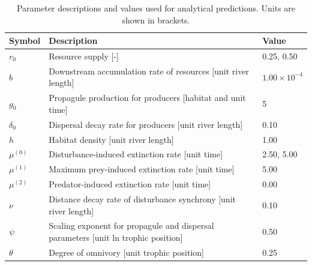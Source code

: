 \begin{table}[ht]
\centering
\caption{Parameter descriptions and values used for analytical predictions. Units are shown in brackets.} 
\label{tab:parms}
\begingroup\small
\begin{tabularx}{\textwidth}{lll}
  \hline
Symbol & Description & Value \\ 
  \hline
$r_0$ & Resource supply [-] & 0.25, 0.50 \\ 
  $b$ & Downstream accumulation rate of resources [unit river length] & $1.00 \times 10^{-4}$ \\ 
  $g_0$ & Propagule production for producers [habitat and unit time] & 5 \\ 
  $\delta_0$ & Dispersal decay rate for producers [unit river length] & 0.10 \\ 
  $h$ & Habitat density [unit river length] & 1.00 \\ 
  $\mu^{(0)}$ & Disturbance-induced extinction rate [unit time] & 2.50, 5.00 \\ 
  $\mu^{(1)}$ & Maximum prey-induced extinction rate [unit time] & 5.00 \\ 
  $\mu^{(2)}$ & Predator-induced extinction rate [unit time] & 0.00 \\ 
  $\nu$ & Distance decay rate of disturbance synchrony [unit river length] & 0.10 \\ 
  $\psi$ & Scaling exponent for propagule and dispersal parameters [unit ln trophic position] & 0.50 \\ 
  $\theta$ & Degree of omnivory [unit trophic position] & 0.25 \\ 
   \hline
\end{tabularx}
\endgroup
\end{table}
